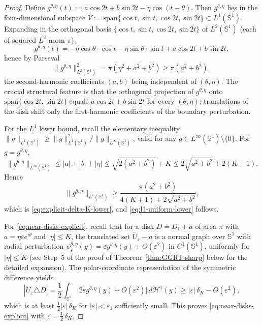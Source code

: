 \documentclass[a4paper,11pt,reqno]{amsart}
\numberwithin{equation}{section}
\theoremstyle{plain} %
\theoremstyle{definition} %
\theoremstyle{remark}
\begin{document}
\begin{proof}
Define
\(g^{\theta,\eta}(t):=a\cos 2t+b\sin 2t-\eta\cos(t-\theta).\)
Then \(g^{\theta,\eta}\) lies in the four-dimensional subspace
\(V:=\mathrm{span}\{\cos t,\sin t,\cos 2t,\sin 2t\}\subset L^1(\mathbb S^1)\).
Expanding in the orthogonal basis
\(\{\cos t,\sin t,\cos 2t,\sin 2t\}\) of \(L^2(\mathbb S^1)\) (each of squared
\(L^2\)-norm \(\pi\)),
\[
g^{\theta,\eta}(t)
=
-\eta\cos\theta\cdot\cos t-\eta\sin\theta\cdot\sin t
+a\cos 2t+b\sin 2t,
\]
hence by Parseval
\[
\|g^{\theta,\eta}\|_{L^2(\mathbb S^1)}^2
=
\pi(\eta^2+a^2+b^2)
\ge
\pi(a^2+b^2),
\]
the second-harmonic coefficients \((a,b)\) being independent of
\((\theta,\eta)\). The crucial structural feature is that the orthogonal
projection of \(g^{\theta,\eta}\) onto \(\mathrm{span}\{\cos 2t,\sin 2t\}\)
equals \(a\cos 2t+b\sin 2t\) for every \((\theta,\eta)\); translations of
the disk shift only the first-harmonic coefficients of the boundary
perturbation.

For the \(L^1\) lower bound, recall the elementary inequality
\(\|g\|_{L^1(\mathbb S^1)}\ge \|g\|_{L^2(\mathbb S^1)}^2/\|g\|_{L^\infty(\mathbb S^1)}\),
valid for any \(g\in L^\infty(\mathbb S^1)\setminus\{0\}\). For
\(g=g^{\theta,\eta}\),
\[
\|g^{\theta,\eta}\|_{L^\infty(\mathbb S^1)}
\le
|a|+|b|+|\eta|
\le
\sqrt{2(a^2+b^2)}+K
\le
2\sqrt{a^2+b^2}+2(K+1).
\]
Hence
\[
\|g^{\theta,\eta}\|_{L^1(\mathbb S^1)}
\ge
\frac{\pi(a^2+b^2)}{4(K+1)+2\sqrt{a^2+b^2}},
\]
which is \eqref{eq:explicit-delta-K-lower}, and
\eqref{eq:l1-uniform-lower} follows.

For \eqref{eq:near-disks-explicit}, recall that for a disk \(D=D_1+a\) of
area \(\pi\) with \(a=\eta\varepsilon e^{i\theta}\) and \(|\eta|\le K\), the
translated set \(\widetilde U_\varepsilon-a\) is a normal graph over
\(\mathbb S^1\) with radial perturbation
\(\psi^{\theta,\eta}_\varepsilon(y)=\varepsilon g^{\theta,\eta}(y)+O(\varepsilon^2)\)
in \(C^1(\mathbb S^1)\), uniformly for \(|\eta|\le K\) (see Step~5 of the
proof of Theorem~\ref{thm:GGRT-sharp} below for the detailed expansion).
The polar-coordinate representation of the symmetric difference yields
\[
|\widetilde U_\varepsilon\triangle D|
=
\frac12\int_{\mathbb S^1}\bigl|2\varepsilon g^{\theta,\eta}(y)+O(\varepsilon^2)\bigr|
\,d\mathcal H^1(y)
\ge
|\varepsilon|\,\delta_K-O(\varepsilon^2),
\]
which is at least \(\frac12 |\varepsilon|\,\delta_K\) for
\(|\varepsilon|<\varepsilon_1\) sufficiently small. This proves
\eqref{eq:near-disks-explicit} with \(c=\frac12\,\delta_K\).


\end{proof}
\end{document}
